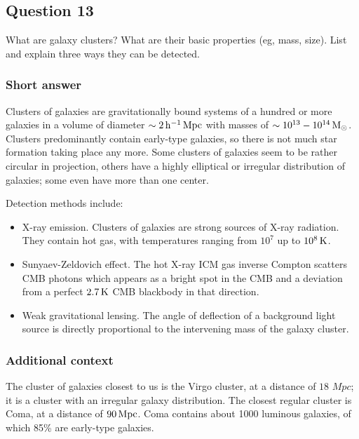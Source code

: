 \documentclass[a4paper,11pt]{article}
\begin{document}

\newpage
\subsection{Question 13}

What are galaxy clusters? What are their basic properties (eg, mass, size). List and explain three ways they can be detected.

\subsubsection{Short answer}

Clusters of galaxies are gravitationally bound systems of a hundred or more galaxies in a volume of diameter $\sim2\,{\rm h^{-1}\,Mpc}$ with masses of $\sim10^{13}-10^{14}\,{\rm M_\odot}$. Clusters predominantly contain early-type galaxies, so there is not much star formation taking place any more. Some clusters of galaxies seem to be rather circular in projection, others have a highly elliptical or irregular distribution of galaxies; some even have more than one center.

{\noindent}Detection methods include:

\begin{itemize}
    \item X-ray emission. Clusters of galaxies are strong sources of X-ray radiation. They contain hot gas, with temperatures ranging from $10^7$ up to $10^8\,{\rm K}$.
    \item Sunyaev-Zeldovich effect. The hot X-ray ICM gas inverse Compton scatters CMB photons which appears as a bright spot in the CMB and a deviation from a perfect $2.7\,{\rm K}$ CMB blackbody in that direction.
    \item Weak gravitational lensing. The angle of deflection of a background light source is directly proportional to the intervening mass of the galaxy cluster.
\end{itemize}

\subsubsection{Additional context}

The cluster of galaxies closest to us is the Virgo cluster, at a distance of $18\,{\, Mpc}$; it is a cluster with an irregular galaxy distribution. The closest regular cluster is Coma, at a distance of $90\,{\rm Mpc}$. Coma contains about 1000 luminous galaxies, of which 85\% are early-type galaxies.
\end{document}
